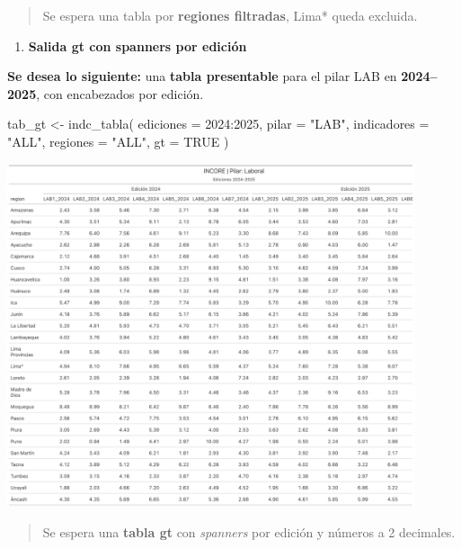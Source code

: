 \documentclass[
  11pt,
  letterpaper,
  DIV=11,
  numbers=noendperiod]{scrartcl}
\newenvironment{Shaded}{\begin{snugshade}}{\end{snugshade}}
\newcommand{\AttributeTok}[1]{\textcolor[rgb]{0.40,0.45,0.13}{#1}}
\newcommand{\ConstantTok}[1]{\textcolor[rgb]{0.56,0.35,0.01}{#1}}
\newcommand{\DecValTok}[1]{\textcolor[rgb]{0.68,0.00,0.00}{#1}}
\newcommand{\FunctionTok}[1]{\textcolor[rgb]{0.28,0.35,0.67}{#1}}
\newcommand{\NormalTok}[1]{\textcolor[rgb]{0.00,0.23,0.31}{#1}}
\newcommand{\OtherTok}[1]{\textcolor[rgb]{0.00,0.23,0.31}{#1}}
\newcommand{\SpecialCharTok}[1]{\textcolor[rgb]{0.37,0.37,0.37}{#1}}
\newcommand{\StringTok}[1]{\textcolor[rgb]{0.13,0.47,0.30}{#1}}
\providecommand{\tightlist}{%
  \setlength{\itemsep}{0pt}\setlength{\parskip}{0pt}}\usepackage{longtable,booktabs,array}
\begin{document}
\begin{quote}
Se espera una tabla por \textbf{regiones filtradas}, Lima* queda
excluida.
\end{quote}

\begin{enumerate}
\def\labelenumi{\arabic{enumi}.}
\setcounter{enumi}{4}
\tightlist
\item
  \textbf{Salida gt con spanners por edición}
\end{enumerate}

\textbf{Se desea lo siguiente:} una \textbf{tabla presentable} para el
pilar LAB en \textbf{2024--2025}, con encabezados por edición.

\begin{Shaded}
\begin{Highlighting}[]
\NormalTok{tab\_gt }\OtherTok{\textless{}{-}} \FunctionTok{indc\_tabla}\NormalTok{(}
  \AttributeTok{ediciones    =} \DecValTok{2024}\SpecialCharTok{:}\DecValTok{2025}\NormalTok{,}
  \AttributeTok{pilar        =} \StringTok{"LAB"}\NormalTok{,}
  \AttributeTok{indicadores  =} \StringTok{"ALL"}\NormalTok{,}
  \AttributeTok{regiones     =} \StringTok{"ALL"}\NormalTok{,}
  \AttributeTok{gt           =} \ConstantTok{TRUE}
\NormalTok{)}
\end{Highlighting}
\end{Shaded}

\begin{center}
\includegraphics[width=0.9\textwidth,height=\textheight]{trem.png}
\end{center}

\begin{quote}
Se espera una \textbf{tabla gt} con \emph{spanners} por edición y
números a 2 decimales.
\end{quote}
\end{document}
